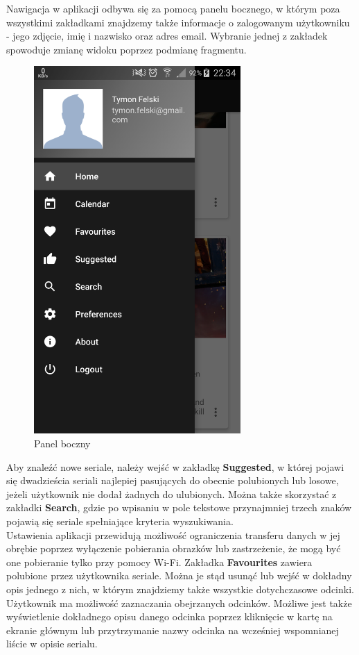 \documentclass[10pt,a4paper]{article}
\begin{document}
\newpage
\noindent
Nawigacja w aplikacji odbywa się za pomocą panelu bocznego, w którym poza wszystkimi zakładkami znajdzemy także informacje o zalogowanym użytkowniku - jego zdjęcie, imię i nazwisko oraz adres email. Wybranie jednej z zakładek spowoduje zmianę widoku poprzez podmianę fragmentu.
\begin{figure}[H]
	\centering
	\includegraphics[height=14cm]{Resources/Images/drawer.png}
	\caption{Panel boczny}
\end{figure}
\noindent
Aby znaleźć nowe seriale, należy wejść w zakładkę \textbf{Suggested}, w której pojawi się dwadzieścia seriali najlepiej pasujących do obecnie polubionych lub losowe, jeżeli użytkownik nie dodał żadnych do ulubionych. Można także skorzystać z zakładki \textbf{Search}, gdzie po wpisaniu w pole tekstowe przynajmniej trzech znaków pojawią się seriale spełniające kryteria wyszukiwania.\\[\baselineskip]
Ustawienia aplikacji przewidują możliwość ograniczenia transferu danych w jej obrębie poprzez wyłączenie pobierania obrazków lub zastrzeżenie, że mogą być one pobieranie tylko przy pomocy Wi-Fi.
\newpage
\noindent
Zakładka \textbf{Favourites} zawiera polubione przez użytkownika seriale. Można je stąd usunąć lub wejść w dokładny opis jednego z nich, w którym znajdziemy także wszystkie dotychczasowe odcinki. Użytkownik ma możliwość zaznaczania obejrzanych odcinków. Możliwe jest także wyświetlenie dokładnego opisu danego odcinka poprzez kliknięcie w kartę na ekranie głównym lub przytrzymanie nazwy odcinka na wcześniej wspomnianej liście w opisie serialu.
\end{document}
